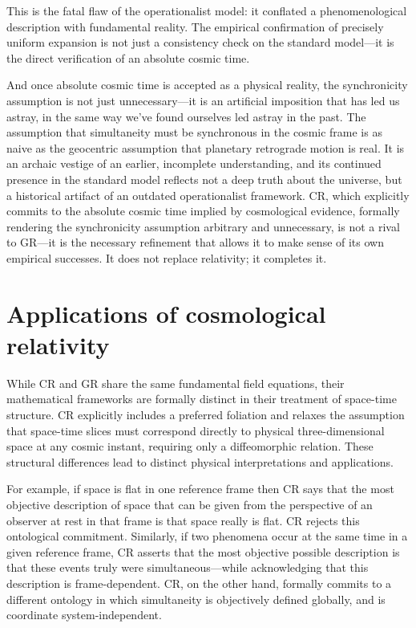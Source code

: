\documentclass[aps,prd,reprint,superscriptaddress]{revtex4-2}
\begin{document}
This is the fatal flaw of the operationalist model: it conflated a phenomenological description with fundamental reality. The empirical confirmation of precisely uniform expansion is not just a consistency check on the standard model---it is the direct verification of an absolute cosmic time.

And once absolute cosmic time is accepted as a physical reality, the synchronicity assumption is not just unnecessary---it is an artificial imposition that has led us astray, in the same way we've found ourselves led astray in the past. The assumption that simultaneity must be synchronous in the cosmic frame is as naive as the geocentric assumption that planetary retrograde motion is real. It is an archaic vestige of an earlier, incomplete understanding, and its continued presence in the standard model reflects not a deep truth about the universe, but a historical artifact of an outdated operationalist framework. CR, which explicitly commits to the absolute cosmic time implied by cosmological evidence, formally rendering the synchronicity assumption arbitrary and unnecessary, is not a rival to GR---it is the necessary refinement that allows it to make sense of its own empirical successes. It does not replace relativity; it completes it.

\section{Applications of cosmological relativity}\label{sec:app}

While CR and GR share the same fundamental field equations, their mathematical frameworks are formally distinct in their treatment of space-time structure. CR explicitly includes a preferred foliation and relaxes the assumption that space-time slices must correspond directly to physical three-dimensional space at any cosmic instant, requiring only a diffeomorphic relation. These structural differences lead to distinct physical interpretations and applications.

For example, if space is flat in one reference frame then CR says that the most objective description of space that can be given from the perspective of an observer at rest in that frame is that space really is flat. CR rejects this ontological commitment. Similarly, if two phenomena occur at the same time in a given reference frame, CR asserts that the most objective possible description is that these events truly were simultaneous---while acknowledging that this description is frame-dependent. CR, on the other hand, formally commits to a different ontology in which simultaneity is objectively defined globally, and is coordinate system-independent.
\end{document}
